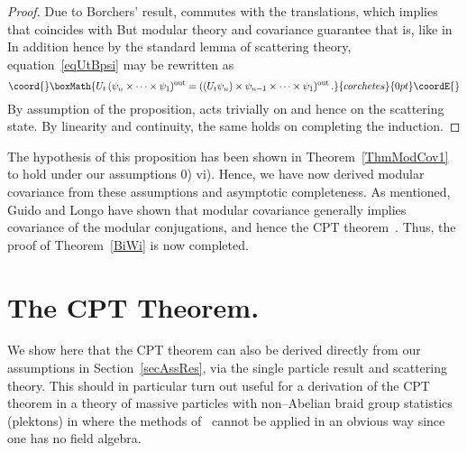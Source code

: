 \documentclass[a4paper,reqno,11pt]{amsart}
\theoremstyle{plain}
\theoremstyle{definition}
\numberwithin{equation}{section}
\providecommand{\F}{{\mathcal F}}
\providecommand{\calH}{{\mathcal H}}
\begin{document}
\begin{proof}
\myHighlight{$\calH^{(n-1)}.$}\coordHE{}  
Due to  Borchers' result, \coordHE{} commutes with the translations, which
implies that \coordHE{} coincides with 
\coordHE{} But modular theory and covariance
guarantee that \coordHE{} is, like \coordHE{} in \myHighlight{$\F(W_1).$}\coordHE{} In
addition \coordHE{}  \myHighlight{$\Omega=$}\coordHE{}  \coordHE{} hence by
the standard lemma of scattering theory, equation~\eqref{eqUtBpsi}
may be rewritten as 
\[\coord{}\boxMath{U_t\,(\psi_n\times\cdots\times\psi_1)^{\rm out}= 
((U_t\psi_n)\times\psi_{n-1}\times\cdots\times\psi_1)^{\rm out}\,.
}{corchetes}{0pt}\coordE{}\]
By assumption of the proposition, \coordHE{} acts trivially on \coordHE{} and 
hence on the scattering state. By linearity  and continuity, the
same holds on \myHighlight{$\calH^{(n)},$}\coordHE{} completing the induction. 
\end{proof}
The hypothesis of this proposition has been shown in
Theorem~\ref{ThmModCov1} to hold under our assumptions 0)\myHighlight{$,\ldots,$}\coordHE{}
vi). Hence, we have now derived modular covariance  from these
assumptions and asymptotic completeness. 
As mentioned, Guido and Longo have shown that modular covariance 
generally implies covariance of the modular conjugations, and hence
the CPT theorem~\cite[Prop.~2.8,~2.9]{GL}. 
Thus, the proof of Theorem~\ref{BiWi} is now completed. 
\section{The CPT Theorem.} \label{secCPT}
We show here that the CPT theorem can also be derived directly   
from our assumptions in Section~\ref{secAssRes}, 
via the single particle result and scattering theory. This should in
particular turn out useful for a derivation of the CPT theorem in a 
theory of massive particles with non--Abelian braid group statistics
(plektons) in \coordHE{} where the methods of~\cite{GL} cannot be
applied in an obvious way since one has no field algebra. 
\end{document}
